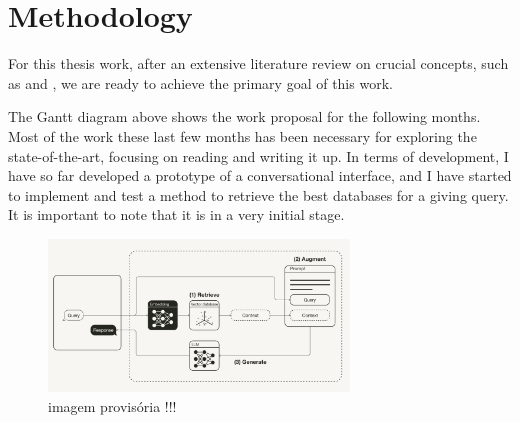 \chapter{Methodology}
\label{chapter:Methodology}

For this thesis work, after an extensive literature review on crucial concepts, such as {\ir} and {\llm}, we are ready to achieve the primary goal of this work.

The Gantt diagram above shows the work proposal for the following months. Most of the work these last few months has been necessary for exploring the state-of-the-art, focusing on reading and writing it up. In terms of development, I have so far developed a prototype of a conversational interface, and I have started to implement and test a {\bm} method to retrieve the best databases for a giving query. It is important to note that it is in a very initial stage.

\begin{figure}[ht]
    \includegraphics[width=8cm]{figs/chapter2/rag_workflow.png}
    \centering
    \caption{imagem provisória !!!}
\end{figure}
